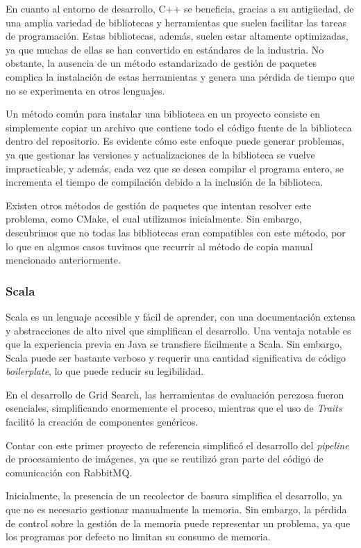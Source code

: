 \documentclass[11pt]{article}
\let\Oldsubsubsection\subsubsection
\renewcommand{\subsubsection}{\FloatBarrier\Oldsubsubsection}
\newcommand{\english}[1]{\textit{#1}}
\begin{document}
En cuanto al entorno de desarrollo, C++ se beneficia, gracias a su antigüedad, de una amplia variedad de bibliotecas y herramientas que suelen facilitar las tareas de programación. Estas bibliotecas, además, suelen estar altamente optimizadas, ya que muchas de ellas se han convertido en estándares de la industria. No obstante, la ausencia de un método estandarizado de gestión de paquetes complica la instalación de estas herramientas y genera una pérdida de tiempo que no se experimenta en otros lenguajes.

Un método común para instalar una biblioteca en un proyecto consiste en simplemente copiar un archivo que contiene todo el código fuente de la biblioteca dentro del repositorio. Es evidente cómo este enfoque puede generar problemas, ya que gestionar las versiones y actualizaciones de la biblioteca se vuelve impracticable, y además, cada vez que se desea compilar el programa entero, se incrementa el tiempo de compilación debido a la inclusión de la biblioteca.

Existen otros métodos de gestión de paquetes que intentan resolver este problema, como CMake, el cual utilizamos inicialmente. Sin embargo, descubrimos que no todas las bibliotecas eran compatibles con este método, por lo que en algunos casos tuvimos que recurrir al método de copia manual mencionado anteriormente.


\subsubsection{Scala}


Scala es un lenguaje accesible y fácil de aprender, con una documentación extensa y abstracciones de alto nivel que simplifican el desarrollo. Una ventaja notable es que la experiencia previa en Java se transfiere fácilmente a Scala. Sin embargo, Scala puede ser bastante verboso y requerir una cantidad significativa de código \english{boilerplate}, lo que puede reducir su legibilidad.

En el desarrollo de Grid Search, las herramientas de evaluación perezosa fueron esenciales, simplificando enormemente el proceso, mientras que el uso de \textit{Traits} facilitó la creación de componentes genéricos.

Contar con este primer proyecto de referencia simplificó el desarrollo del \english{pipeline} de procesamiento de imágenes, ya que se reutilizó gran parte del código de comunicación con RabbitMQ.

Inicialmente, la presencia de un recolector de basura simplifica el desarrollo, ya que no es necesario gestionar manualmente la memoria. Sin embargo, la pérdida de control sobre la gestión de la memoria puede representar un problema, ya que los programas por defecto no limitan su consumo de memoria.
\end{document}
